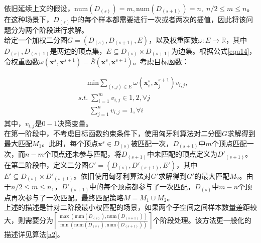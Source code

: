 \documentclass{NauThesis}
\begin{document}
\\\hspace*{2em}依旧延续上文的假设，$\text{num}(D_{(s)})=m,\text{num}(D_{(s+1)})=n,\;n/2\le m\le n$。在这种场景下，$D_{(s)}$中的每个样本都需要进行一次或者两次的插值，因此将该问题分为两个阶段进行求解。
\\\hspace*{2em}给定一个加权二分图$G=(D_{(s)},D_{(s+1)},E)$，以及权重函数$\omega:E\rightarrow\mathbb{R}$，其中$D_{(s)},D_{(s+1)}$是两边的顶点集，$E\subseteq D_{(s)}\times D_{(s+1)}$为边集。根据公式\eqref{equ14}，令权重函数$\omega(\boldsymbol{x}^{s},\boldsymbol{x}^{s+1})=\bar{S}(\boldsymbol{x}^{s},\boldsymbol{x}^{s+1})$。考虑目标函数：


$$\begin{aligned}
    &\quad\;\text{min}\textstyle\sum\limits_{(i,j)\in{E}}\omega(\boldsymbol{x}^{s}_i,\boldsymbol{x}_j^{s+1})v_{i,j},\\
    &s.t.\; \textstyle\sum\limits_{i=1}^{m}v_{i,j}\in{1,2},\forall j\\  
    &\quad\;\;
    \textstyle\sum\limits_{j=1}^nv_{i,j}=1,\forall i
    \end{aligned}$$
其中，$v_{i,j}$是$0-1$决策变量。\\
\hspace*{2em}在第一阶段中，不考虑目标函数约束条件下，使用匈牙利算法对二分图$G$求解得到最大匹配$M_1$。此时，每个顶点$\boldsymbol{x}^s\in D_{(s)}$被匹配一次，$D_{(s+1)}$中$m$个顶点匹配一次，而$n-m$个顶点还未参与匹配，将$D_{(s+1)}$中未匹配的顶点定义为$D'_{(s+1)}$。
\\\hspace*{2em}在第二阶段中，定义二分图$G'=(D_{(s)},D'_{(s+1)},E')$，其中$E'\subseteq D_{(s)}\times D'_{(s+1)}$。依旧使用匈牙利算法对$G'$求解得到$G'$的最大匹配$M_2$。由于$n/2\le m\le n,$，$D'_{(s+1)}$中的每个顶点都参与了一次匹配，$D_{(s)}$中$m-n$个顶点再次参与了一次匹配。最终匹配策略$M=M_1\cup{M_2}$。
\\\hspace*{2em}上述的描述是针对二阶段最小权匹配的场景，如果两个子空间之间样本数量差距较大，则需要分为$\left\lceil \frac{\max(\text{num}{(D_{(s)}),\text{num}(D_{(s+1)})})}{\min(\text{num}{(D_{(s)}),\text{num}(D_{(s+1)})})}\right\rceil$个阶段处理。该方法更一般化的描述详见算法\ref{a2}。
\end{document}
